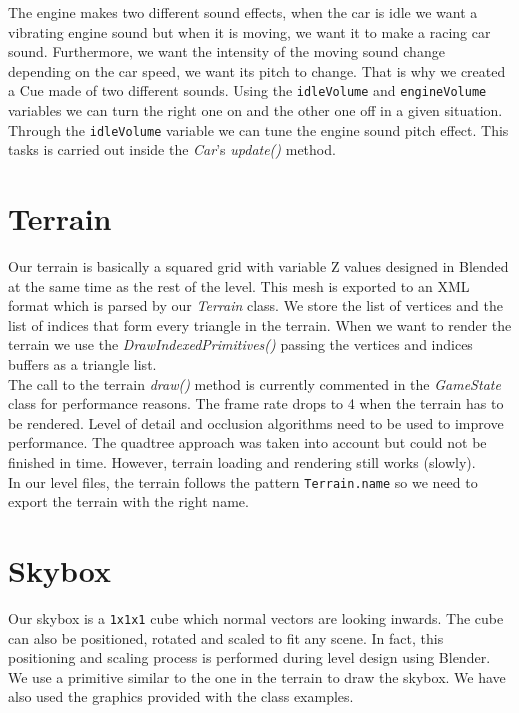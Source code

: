 

The engine makes two different sound effects, when the car is idle we want a vibrating engine
sound but when it is moving, we want it to make a racing car sound. Furthermore, we want
the intensity of the moving sound change depending on the car speed, we want its pitch to change.
That is why we created a Cue made of two different sounds. Using the \texttt{idleVolume} and
\texttt{engineVolume} variables we can turn the right one on and the other one off in a given
situation. Through the \texttt{idleVolume} variable we can tune the engine sound pitch effect.
This tasks is carried out inside the \textit{Car}'s \textit{update()} method.



\section{Terrain}
\label{sec:terrain}

Our terrain is basically a squared grid with variable Z values designed in Blended at the
same time as the rest of the level. This mesh is exported to an XML format which is parsed
by our \textit{Terrain} class. We store the list of vertices and the list of indices that
form every triangle in the terrain. When we want to render the terrain we use the
\textit{DrawIndexedPrimitives()} passing the vertices and indices buffers as a triangle list.\\

The call to the terrain \textit{draw()} method is currently commented in the \textit{GameState}
class for performance reasons. The frame rate drops to 4 when the terrain has to be rendered.
Level of detail and occlusion algorithms need to be used to improve performance. The quadtree
approach was taken into account but could not be finished in time. However, terrain loading and
rendering still works (slowly).\\

In our level files, the terrain follows the pattern \texttt{Terrain.name} so we need to 
export the terrain with the right name.\\

\section{Skybox}

Our skybox is a \texttt{1x1x1} cube which normal vectors are looking inwards. The cube can also
be positioned, rotated and scaled to fit any scene. In fact, this positioning and scaling process
is performed during level design using Blender. We use a primitive similar to the one in the
terrain to draw the skybox. We have also used the graphics provided with the class examples.\\